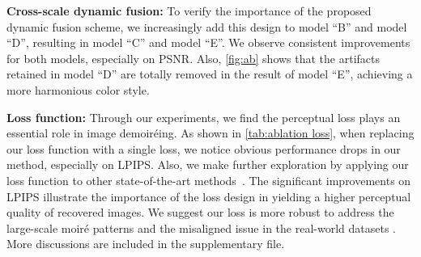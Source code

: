 \documentclass[runningheads]{llncs}
\begin{document}
\noindent\textbf{Cross-scale dynamic fusion:}
To verify the importance of the proposed dynamic fusion scheme, we increasingly add this design to model ``B'' and model ``D'', resulting in model ``C'' and model ``E''. We observe consistent improvements for both models, especially on PSNR. Also, \cref{fig:ab} shows that the artifacts retained in model ``D'' are totally removed in the result of model ``E'', achieving a more harmonious color style.


\noindent\textbf{Loss function:} Through our experiments, we find the perceptual loss plays an essential role in image demoiréing. As shown in \cref{tab:ablation loss}, when replacing our loss function with a single  loss, we notice obvious performance drops in our method, especially on LPIPS. Also, we make further exploration by applying our loss function to other state-of-the-art methods~\cite{sun2018moire,cheng2019multi}. The significant improvements on LPIPS illustrate the importance of the loss design in yielding a higher perceptual quality of recovered images. We suggest our loss is more robust to address the large-scale moiré patterns and the misaligned issue in the real-world datasets \cite{he2020fhde,sun2018moire}. More discussions are included in the supplementary file.







\begin{table*}[t]
    \caption{Ablation study of the loss function. The left and the right of ``/'' denote results trained by the pixel-wise  loss and trained by our loss, respectively}
   \centering
   \renewcommand\tabcolsep{5.0pt}


\label{tab:ablation loss}
\end{table*}
\end{document}
